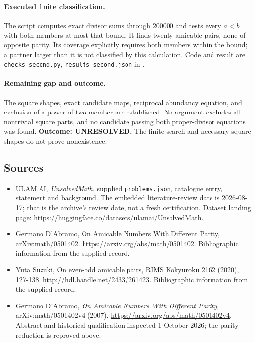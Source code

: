 \documentclass[11pt,a4paper]{article}
\begin{document}
\paragraph{Executed finite classification.}
The script computes exact divisor sums through $200000$ and tests
every $a<b$ with both members at most that bound. It finds twenty
amicable pairs, none of opposite parity. Its coverage explicitly
requires both members within the bound; a partner larger than it is
not classified by this calculation. Code and result are
\texttt{checks\_second.py}, \texttt{results\_second.json} in
.

\paragraph{Remaining gap and outcome.}
The square shapes, exact candidate maps, reciprocal abundancy equation,
and exclusion of a power-of-two member are established. No argument
excludes all nontrivial square parts, and no candidate passing both
proper-divisor equations was found. \textbf{Outcome: UNRESOLVED.}
The finite search and necessary square shapes do not prove nonexistence.

\subsection{Sources}

{\small

\begin{itemize}

\item[\hypertarget{source:statement:1}{S1}] ULAM.AI, \emph{UnsolvedMath}, supplied \texttt{problems.json}, catalogue entry, statement and background. The embedded literature-review date is 2026-08-17; that is the archive’s review date, not a fresh certification. Dataset landing page: \url{https://huggingface.co/datasets/ulamai/UnsolvedMath}.

\item[\hypertarget{source:statement:2}{S2}] Germano D'Abramo, On Amicable Numbers With Different Parity, arXiv:math/0501402. \url{https://arxiv.org/abs/math/0501402}. Bibliographic information from the supplied record.

\item[\hypertarget{source:statement:3}{S3}] Yuta Suzuki, On even-odd amicable pairs, RIMS Kokyuroku 2162 (2020), 127-138. \url{http://hdl.handle.net/2433/261423}. Bibliographic information from the supplied record.


\item[E1] Germano D'Abramo, \emph{On Amicable Numbers With Different
Parity}, arXiv:math/0501402v4 (2007).
\url{https://arxiv.org/abs/math/0501402v4}. Abstract and historical
qualification inspected 1 October 2026; the parity reduction is reproved above.

\end{itemize}

}

\label{end:statement}
\end{document}
